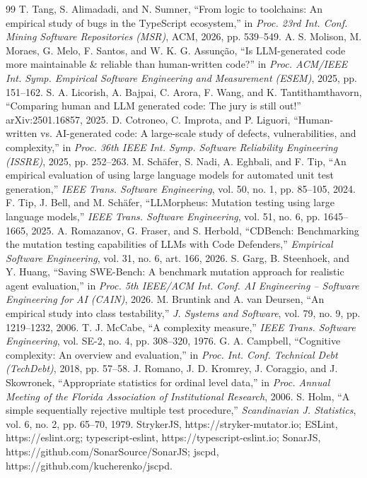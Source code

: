 \documentclass[10pt,conference]{IEEEtran}
\begin{document}
\begin{thebibliography}{99}
 T. Tang, S. Alimadadi, and N. Sumner, “From logic to toolchains: An empirical study of bugs in the TypeScript ecosystem,” in \emph{Proc. 23rd Int. Conf. Mining Software Repositories (MSR)}, ACM, 2026, pp. 539--549.
 A. S. Molison, M. Moraes, G. Melo, F. Santos, and W. K. G. Assunção, “Is LLM-generated code more maintainable \& reliable than human-written code?” in \emph{Proc. ACM/IEEE Int. Symp. Empirical Software Engineering and Measurement (ESEM)}, 2025, pp. 151--162.
 S. A. Licorish, A. Bajpai, C. Arora, F. Wang, and K. Tantithamthavorn, “Comparing human and LLM generated code: The jury is still out!” arXiv:2501.16857, 2025.
 D. Cotroneo, C. Improta, and P. Liguori, “Human-written vs. AI-generated code: A large-scale study of defects, vulnerabilities, and complexity,” in \emph{Proc. 36th IEEE Int. Symp. Software Reliability Engineering (ISSRE)}, 2025, pp. 252--263.
 M. Schäfer, S. Nadi, A. Eghbali, and F. Tip, “An empirical evaluation of using large language models for automated unit test generation,” \emph{IEEE Trans. Software Engineering}, vol. 50, no. 1, pp. 85--105, 2024.
 F. Tip, J. Bell, and M. Schäfer, “LLMorpheus: Mutation testing using large language models,” \emph{IEEE Trans. Software Engineering}, vol. 51, no. 6, pp. 1645--1665, 2025.
 A. Romazanov, G. Fraser, and S. Herbold, “CDBench: Benchmarking the mutation testing capabilities of LLMs with Code Defenders,” \emph{Empirical Software Engineering}, vol. 31, no. 6, art. 166, 2026.
 S. Garg, B. Steenhoek, and Y. Huang, “Saving SWE-Bench: A benchmark mutation approach for realistic agent evaluation,” in \emph{Proc. 5th IEEE/ACM Int. Conf. AI Engineering -- Software Engineering for AI (CAIN)}, 2026.
 M. Bruntink and A. van Deursen, “An empirical study into class testability,” \emph{J. Systems and Software}, vol. 79, no. 9, pp. 1219--1232, 2006.
 T. J. McCabe, “A complexity measure,” \emph{IEEE Trans. Software Engineering}, vol. SE-2, no. 4, pp. 308--320, 1976.
 G. A. Campbell, “Cognitive complexity: An overview and evaluation,” in \emph{Proc. Int. Conf. Technical Debt (TechDebt)}, 2018, pp. 57--58.
 J. Romano, J. D. Kromrey, J. Coraggio, and J. Skowronek, “Appropriate statistics for ordinal level data,” in \emph{Proc. Annual Meeting of the Florida Association of Institutional Research}, 2006.
 S. Holm, “A simple sequentially rejective multiple test procedure,” \emph{Scandinavian J. Statistics}, vol. 6, no. 2, pp. 65--70, 1979.
 StrykerJS, https://stryker-mutator.io; ESLint, https://eslint.org; typescript-eslint, https://typescript-eslint.io; SonarJS, https://github.com/SonarSource/SonarJS; jscpd, https://github.com/kucherenko/jscpd.
\end{thebibliography}
\end{document}
